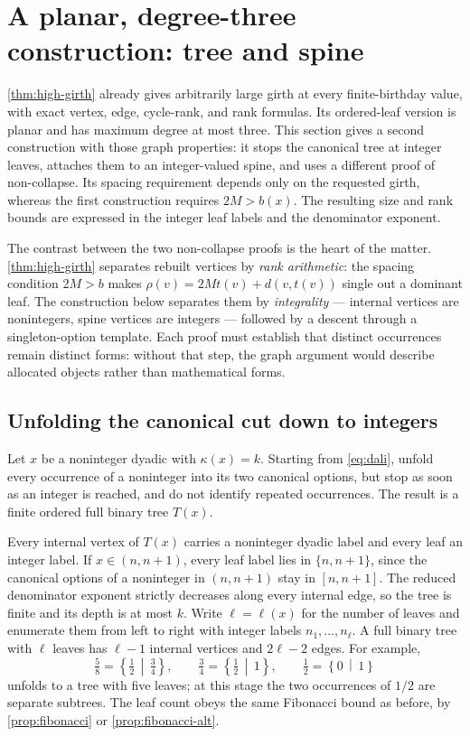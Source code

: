 \documentclass[11pt,a4paper]{article}
\numberwithin{equation}{section}
\theoremstyle{definition}
\theoremstyle{remark}
\newcommand{\rk}{\rho}
\newcommand{\cut}[2]{\left\{#1\,\middle|\,#2\right\}}
\begin{document}
\section{A planar, degree-three construction: tree and spine}
\label{sec:sparse}

\cref{thm:high-girth} already gives arbitrarily large girth at every
finite-birthday value, with exact vertex, edge, cycle-rank, and rank formulas.
Its ordered-leaf version is planar and has maximum degree at most three. This
section gives a second construction with those graph properties: it stops the
canonical tree at integer leaves, attaches them to an integer-valued spine,
and uses a different proof of non-collapse. Its spacing requirement depends
only on the requested girth, whereas the first construction requires $2M>b(x)$.
The resulting size and rank bounds are expressed in the integer leaf labels
and the denominator exponent.

The contrast between the two non-collapse proofs is the heart of the matter.
\cref{thm:high-girth} separates rebuilt vertices by \emph{rank arithmetic}: the
spacing condition $2M>b$ makes $\rk(v)=2Mt(v)+d(v,t(v))$ single out a dominant
leaf. The construction below separates them by \emph{integrality} --- internal
vertices are nonintegers, spine vertices are integers --- followed by a descent
through a singleton-option template. Each proof must establish that distinct
occurrences remain distinct forms: without that step, the graph
argument would describe allocated objects rather than mathematical forms.

\subsection{Unfolding the canonical cut down to integers}

Let $x$ be a noninteger dyadic with $\kappa(x)=k$. Starting from
\eqref{eq:dali}, unfold every occurrence of a noninteger into its two canonical
options, but stop as soon as an integer is reached, and do not identify repeated
occurrences. The result is a finite ordered full binary tree $T(x)$.

Every internal vertex of $T(x)$ carries a noninteger dyadic label and every leaf
an integer label. If $x\in(n,n+1)$, every leaf label lies in $\{n,n+1\}$, since
the canonical options of a noninteger in $(n,n+1)$ stay in $[n,n+1]$. The
reduced denominator exponent strictly decreases along every internal edge, so
the tree is finite and its depth is at most $k$. Write $\ell=\ell(x)$ for the
number of leaves and enumerate them from left to right with integer labels
$n_1,\ldots,n_\ell$. A full binary tree with $\ell$ leaves has $\ell-1$ internal
vertices and $2\ell-2$ edges. For example,
\begin{equation}
 \tfrac58=\cut{\tfrac12}{\tfrac34},\qquad
 \tfrac34=\cut{\tfrac12}{1},\qquad
 \tfrac12=\cut{0}{1}
\end{equation}
unfolds to a tree with five leaves; at this stage the two occurrences of $1/2$
are separate subtrees. The leaf count obeys the same Fibonacci bound as before,
by \cref{prop:fibonacci} or \cref{prop:fibonacci-alt}.
\end{document}

